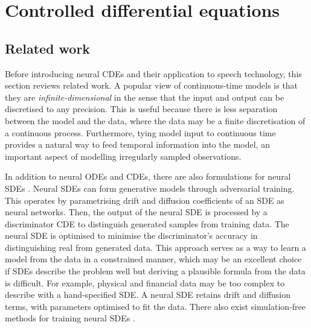 \chapter{Controlled differential equations}

\section{Related work}

Before introducing neural \acp{CDE} and their application to speech technology, this section reviews related work. A popular view of continuous-time models is that they are \textit{infinite-dimensional} in the sense that the input and output can be discretised to any precision. This is useful because there is less separation between the model and the data, where the data may be a finite discretisation of a continuous process. Furthermore, tying model input to continuous time provides a natural way to feed temporal information into the model, an important aspect of modelling irregularly sampled observations.

In addition to neural \acp{ODE} and \acp{CDE}, there are also formulations for neural \acp{SDE} \citep{kidger2021sdegan}. Neural \acp{SDE} can form generative models through adversarial training. This operates by parametrising drift and diffusion coefficients of an \ac{SDE} as neural networks. Then, the output of the neural \ac{SDE} is processed by a discriminator \ac{CDE} to distinguish generated samples from training data. The neural \ac{SDE} is optimised to minimise the discriminator's accuracy in distinguishing real from generated data. This approach serves as a way to learn a model from the data in a constrained manner, which may be an excellent choice if \acp{SDE} describe the problem well but deriving a plausible formula from the data is difficult. For example, physical and financial data may be too complex to describe with a hand-specified \ac{SDE}. A neural \ac{SDE} retains drift and diffusion terms, with parameters optimised to fit the data. There also exist simulation-free methods for training neural \acp{SDE} \citep{zhang2024trajflow}.

